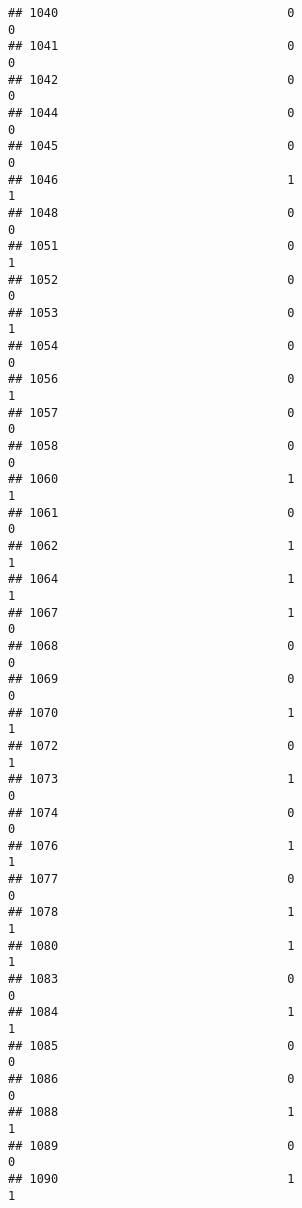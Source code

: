 \documentclass[
]{article}
\begin{document}
\begin{verbatim}
## 1040                                0                                0
## 1041                                0                                0
## 1042                                0                                0
## 1044                                0                                0
## 1045                                0                                0
## 1046                                1                                1
## 1048                                0                                0
## 1051                                0                                1
## 1052                                0                                0
## 1053                                0                                1
## 1054                                0                                0
## 1056                                0                                1
## 1057                                0                                0
## 1058                                0                                0
## 1060                                1                                1
## 1061                                0                                0
## 1062                                1                                1
## 1064                                1                                1
## 1067                                1                                0
## 1068                                0                                0
## 1069                                0                                0
## 1070                                1                                1
## 1072                                0                                1
## 1073                                1                                0
## 1074                                0                                0
## 1076                                1                                1
## 1077                                0                                0
## 1078                                1                                1
## 1080                                1                                1
## 1083                                0                                0
## 1084                                1                                1
## 1085                                0                                0
## 1086                                0                                0
## 1088                                1                                1
## 1089                                0                                0
## 1090                                1                                1

\end{verbatim}
\end{document}
